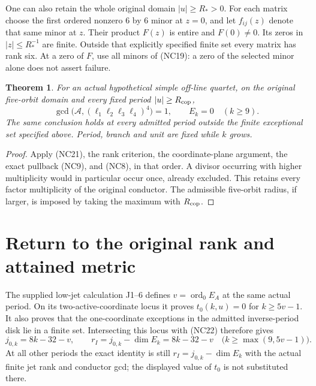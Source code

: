 \documentclass[11pt]{article}
\newtheorem{theorem}{Theorem}
\newcommand{\ord}{\operatorname{ord}}
\begin{document}
One can also retain the whole original domain $|u|\ge R_*>0$.
For each matrix choose the first ordered nonzero $6$ by $6$ minor at
$z=0$, and let $f_{ij}(z)$ denote that same minor at $z$. Their
product $F(z)$ is entire and $F(0)\ne0$. Its zeros in
$|z|\le R_*^{-1}$ are finite. Outside that explicitly specified finite
set every matrix has rank six. At a zero of $F$, use all minors of
(NC19): a zero of the selected minor alone does not assert failure.

\begin{theorem}
For an actual hypothetical simple off-line quartet, on the original
five-orbit domain and every fixed period $|u|\ge R_{\rm cop}$,
\[
 \gcd\bigl(\mathcal A,(\ell_1\ell_2\ell_3\ell_4)^4\bigr)=1,
 \qquad E_k=0\quad(k\ge9). \tag{NC22}
\]
The same conclusion holds at every admitted period outside the finite
exceptional set specified above. Period, branch and unit are fixed
while $k$ grows.
\end{theorem}
\begin{proof}
Apply (NC21), the rank criterion, the coordinate-plane argument, the
exact pullback (NC9), and (NC8), in that order. A divisor occurring
with higher multiplicity would in particular occur once, already
excluded. This retains every factor multiplicity of the original
conductor. The admissible five-orbit radius, if larger, is imposed by
taking the maximum with $R_{\rm cop}$.
\end{proof}

\section{Return to the original rank and attained metric}
The supplied low-jet calculation J1--6 \cite{Native} defines
$v=\ord_0E_A$ at the same actual period. On its two-active-coordinate
locus it proves $t_0(k,u)=0$ for $k\ge5v-1$. It also proves that the
one-coordinate exceptions in the admitted inverse-period disk lie in
a finite set. Intersecting this locus with (NC22) therefore gives
\[
 j_{0,k}=8k-32-v,\qquad r_I=j_{0,k}-\dim E_k=8k-32-v
 \quad\bigl(k\ge\max(9,5v-1)\bigr). \tag{NC23}
\]
At all other periods the exact identity is still
$r_I=j_{0,k}-\dim E_k$ with the actual finite jet rank and conductor
gcd; the displayed value of $t_0$ is not substituted there.
\end{document}
